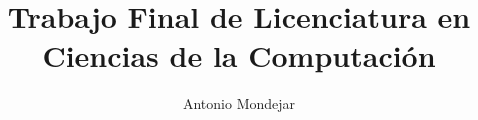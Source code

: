 \documentclass[a4paper,12pt,oneside,openright]{report}
\begin{document}
\title{Trabajo Final de Licenciatura en Ciencias de la Computación}

\author{Antonio Mondejar}

\maketitle

{\hypersetup{linkcolor=black}%
\tableofcontents}
\cleardoublepage






        







\end{document}

